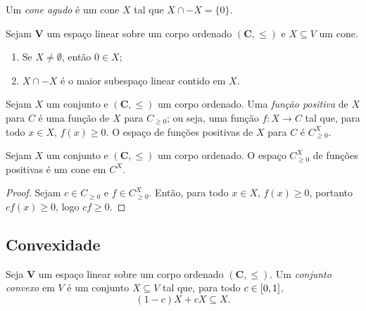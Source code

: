 Um \emph{cone agudo} é um cone $X$ tal que $X \cap -X = \{0\}$.

\begin{proposition}
Sejam $\bm V$ um espaço linear sobre um corpo ordenado $(\bm C,\leq)$ e $X \subseteq V$ um cone.
	\begin{enumerate}
	\item Se $X \neq \emptyset$, então $0 \in X$;
	\item $X \cap -X$ é o maior subespaço linear contido em $X$.
	\end{enumerate}
\end{proposition}

\begin{definition}
Sejam $X$ um conjunto e $(\bm C,\leq)$ um corpo ordenado. Uma \emph{função positiva} de $X$ para $C$ é uma função de $X$ para $C_{\geq 0}$; ou seja, uma função $f\colon X \to C$ tal que, para todo $x \in X$, $f(x) \geq 0$. O espaço de funções positivas de $X$ para $C$ é $C^X_{\geq 0}$.
\end{definition}


\begin{proposition}
Sejam $X$ um conjunto e $(\bm C,\leq)$ um corpo ordenado. O espaço $C^X_{\geq 0}$ de funções positivas é um cone em $C^X$.
\end{proposition}
\begin{proof}
Sejam $c \in C_{\geq 0}$ e $f \in C^X_{\geq 0}$. Então, para todo $x \in X$, $f(x) \geq 0$, portanto $cf(x) \geq 0$, logo $cf \geq 0$.
\end{proof}





\subsection{Convexidade}

\begin{definition}
Seja $\bm V$ um espaço linear sobre um corpo ordenado $(\bm C,\leq)$. Um \emph{conjunto convexo} em $V$ é um conjunto $X \subseteq V$ tal que, para todo $c \in \left[{0},{1}\right]$,
	\begin{equation*}
	(1-c)X + cX \subseteq X.
	\end{equation*}
\end{definition}

